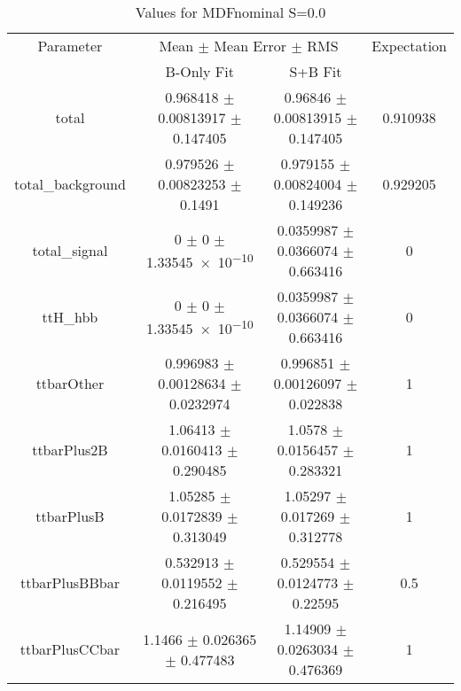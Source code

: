 \begin{table}
\centering
\caption{Values for MDFnominal S=0.0}
\begin{tabular}{cccc}
\toprule
Parameter & \multicolumn{2}{c}{Mean $\pm$ Mean Error $\pm$ RMS} & Expectation\\
 & B-Only Fit & S+B Fit & \\
\midrule
total & \num{0.968418} $\pm$ \num{0.00813917} $\pm$ \num{0.147405} & \num{0.96846} $\pm$ \num{0.00813915} $\pm$ \num{0.147405} & \num{0.910938}\\
total\_background & \num{0.979526} $\pm$ \num{0.00823253} $\pm$ \num{0.1491} & \num{0.979155} $\pm$ \num{0.00824004} $\pm$ \num{0.149236} & \num{0.929205}\\
total\_signal & \num{0} $\pm$ \num{0} $\pm$ \num{1.33545e-10} & \num{0.0359987} $\pm$ \num{0.0366074} $\pm$ \num{0.663416} & \num{0}\\
ttH\_hbb & \num{0} $\pm$ \num{0} $\pm$ \num{1.33545e-10} & \num{0.0359987} $\pm$ \num{0.0366074} $\pm$ \num{0.663416} & \num{0}\\
ttbarOther & \num{0.996983} $\pm$ \num{0.00128634} $\pm$ \num{0.0232974} & \num{0.996851} $\pm$ \num{0.00126097} $\pm$ \num{0.022838} & \num{1}\\
ttbarPlus2B & \num{1.06413} $\pm$ \num{0.0160413} $\pm$ \num{0.290485} & \num{1.0578} $\pm$ \num{0.0156457} $\pm$ \num{0.283321} & \num{1}\\
ttbarPlusB & \num{1.05285} $\pm$ \num{0.0172839} $\pm$ \num{0.313049} & \num{1.05297} $\pm$ \num{0.017269} $\pm$ \num{0.312778} & \num{1}\\
ttbarPlusBBbar & \num{0.532913} $\pm$ \num{0.0119552} $\pm$ \num{0.216495} & \num{0.529554} $\pm$ \num{0.0124773} $\pm$ \num{0.22595} & \num{0.5}\\
ttbarPlusCCbar & \num{1.1466} $\pm$ \num{0.026365} $\pm$ \num{0.477483} & \num{1.14909} $\pm$ \num{0.0263034} $\pm$ \num{0.476369} & \num{1}\\
\bottomrule
\end{tabular}
\end{table}